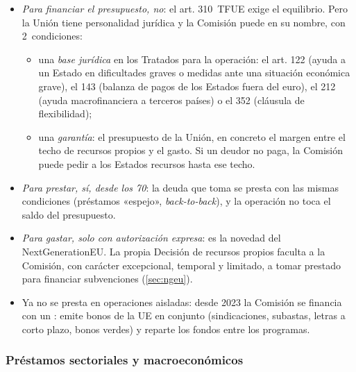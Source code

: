 \documentclass[11pt]{article}
\begin{document}
\begin{itemize}
\item \emph{Para financiar el presupuesto, no}: el art. 310~TFUE exige el equilibrio. Pero la Unión tiene personalidad jurídica y la Comisión puede  en su nombre, con 2~condiciones:
  \begin{itemize}
  \item una \emph{base jurídica} en los Tratados para la operación: el art. 122 (ayuda a un Estado en dificultades graves o medidas ante una situación económica grave), el 143 (balanza de pagos de los Estados fuera del euro), el 212 (ayuda macrofinanciera a terceros países) o el 352 (cláusula de flexibilidad);
  \item una \emph{garantía}: el presupuesto de la Unión, en concreto el margen entre el techo de recursos propios y el gasto. Si un deudor no paga, la Comisión puede pedir a los Estados recursos hasta ese techo.
  \end{itemize}
\item \emph{Para prestar, sí, desde los 70}: la deuda que toma se presta con las mismas condiciones (préstamos «espejo», \emph{back-to-back}), y la operación no toca el saldo del presupuesto.
\item \emph{Para gastar, solo con autorización expresa}: es la novedad del NextGenerationEU. La propia Decisión de recursos propios faculta a la Comisión, con carácter excepcional, temporal y limitado, a tomar prestado para financiar subvenciones (\ref{sec:ngeu}).
\item Ya no se presta en operaciones aisladas: desde 2023 la Comisión se financia con un : emite bonos de la UE en conjunto (sindicaciones, subastas, letras a corto plazo, bonos verdes) y reparte los fondos entre los programas\nocite{CE2026Emisor}.
\end{itemize}

\subsubsection{Préstamos sectoriales y macroeconómicos}\label{sec:macro}
\end{document}
